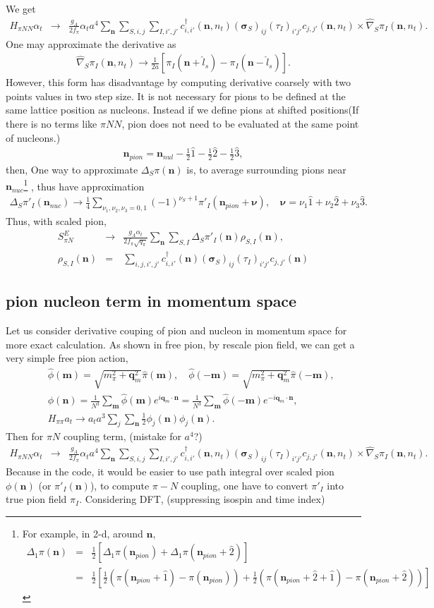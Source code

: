 \documentclass[10pt]{book}
\def\bm{\boldsymbol}
\newcommand{\bea}{\begin{eqnarray}}
\newcommand{\eea}{\end{eqnarray}}
\newcommand{\no}{\nonumber \\}
\def\vs{{\bm \sigma}}
\def\vn{{\bm n}}
\begin{document}
We get
\bea 
H_{\pi NN}\alpha_t &\to& \frac{g_A}{2f_\pi}
            \alpha_t a^4 \sum_{\vn}\sum_{S,i,j}\sum_{I,i',j'}
            c^\dagger_{i,i'}(\vn,n_t) (\vs_{S})_{ij}(\tau_{I})_{i'j'}
            c_{j,j'}(\vn,n_t)\times \hat{\nabla}_S \pi_I(\vn,n_t) .
\eea 
One may approximate the derivative as
\bea 
\hat{\nabla}_S \pi_I(\vn,n_t)
\to \frac{1}{2a}[\pi_I(\vn+\hat{l}_s)-\pi_I(\vn-\hat{l}_s)].
\eea 
However, this form has disadvantage by computing derivative coarsely with two points values 
in  two step size.  
It is not necessary for pions to be defined at the same lattice position as nucleons.
Instead if we define pions at shifted positions(If there is no terms like $\pi N N$,
pion does not need to be evaluated at the same point of nucleons.)
\bea 
\vn_{pion}=\vn_{nul}-\frac{1}{2}\hat{1}-\frac{1}{2}\hat{2}-\frac{1}{2}\hat{3},
\eea 
then, One way to approximate $\Delta_S\pi(\vn)$ is,
to average surrounding pions near $\vn_{nuc}$\footnote{
For example, in 2-d, around $\vn$, 
\bea 
\Delta_{1} \pi(\vn)&=&\frac{1}{2}[\Delta_{1} \pi(\vn_{pion})+\Delta_{1} \pi(\vn_{pion}+\hat{2})]
\no 
                   &=&\frac{1}{2}[\frac{1}{2}(\pi(\vn_{pion}+\hat{1})-\pi(\vn_{pion}))
                               +\frac{1}{2}(\pi(\vn_{pion}+\hat{2}+\hat{1})
                                -\pi(\vn_{pion}+\hat{2}))]
\eea 
} , thus have approximation 
\bea 
\Delta_S \pi'_I(\vn_{nuc})\to \frac{1}{4}\sum_{\nu_1,\nu_2,\nu_3=0,1}
    (-1)^{\nu_S+1}\pi'_{I}(\vn_{pion}+{\bm \nu} ),
    \quad {\bm \nu}=\nu_1\hat{1}+\nu_2\hat{2}+\nu_3\hat{3}.
\eea 
Thus, with scaled pion, 
\bea 
S_{\pi N}^E &\to& \frac{g_A \alpha_t}{2f_\pi\sqrt{q_\pi}}
             \sum_{\vn}\sum_{S,I} \Delta_S \pi'_I(\vn) \rho_{S,I}(\vn),\no 
\rho_{S,I}(\vn)&=&\sum_{i,j,i',j'} 
            c^\dagger_{i,i'}(\vn) (\vs_{S})_{ij}(\tau_{I})_{i'j'}
            c_{j,j'}(\vn) 
\eea 

\subsection{pion nucleon term in momentum space}
Let us consider derivative couping of pion and nucleon in momentum space
for more exact calculation.
As shown in free pion, by rescale pion field, we can get a very simple free pion action,
\bea 
& &\hat{\phi}({\bm m})=\sqrt{m_\pi^2+{\bm q}_m^2}\hat{\pi}({\bm m}),\quad 
\hat{\phi}(-{\bm m})=\sqrt{m_\pi^2+{\bm q}_m^2}\hat{\pi}(-{\bm m}),\no 
& &{\phi}({\bm n})=\frac{1}{N^3}\sum_{\bm m} \hat{\phi}({\bm m})e^{i{\bm q}_m\cdot{\bm n}}
=\frac{1}{N^3}\sum_{\bm m} \hat{\phi}(-{\bm m})e^{-i{\bm q}_m\cdot{\bm n}} ,\no 
& &H_{\pi\pi}a_t\to a_t a^3 \sum_{j}\sum_{\bm n} \frac{1}{2}\phi_j({\bm n})\phi_j({\bm n}).
\eea 
Then for $\pi N$ coupling term, ({\color{red}mistake for $a^4$?})
\bea 
H_{\pi NN}\alpha_t &\to& \frac{g_A}{2f_\pi}
\alpha_t a^4 \sum_{\vn}\sum_{S,i,j}\sum_{I,i',j'}
c^\dagger_{i,i'}(\vn,n_t) (\vs_{S})_{ij}(\tau_{I})_{i'j'}
c_{j,j'}(\vn,n_t)\times \hat{\nabla}_S \pi_I(\vn,n_t) .
\eea 
Because in the code, it would be easier to use path integral over scaled pion $\phi(\vn)$ (or $\pi'_I(\vn)$),
to compute $\pi-N$ coupling, one have to convert $\pi'_I$ into true pion field $\pi_I$.
Considering DFT, (suppressing isospin and time index)
\end{document}
